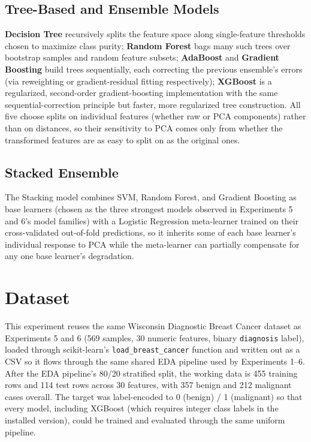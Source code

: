 \documentclass[11pt,a4paper]{article}
\begin{document}
\subsection{Tree-Based and Ensemble Models}
\textbf{Decision Tree} recursively splits the feature space along single-feature thresholds chosen to maximize class purity; \textbf{Random Forest} bags many such trees over bootstrap samples and random feature subsets; \textbf{AdaBoost} and \textbf{Gradient Boosting} build trees sequentially, each correcting the previous ensemble's errors (via reweighting or gradient-residual fitting respectively); \textbf{XGBoost} is a regularized, second-order gradient-boosting implementation with the same sequential-correction principle but faster, more regularized tree construction. All five choose splits on individual features (whether raw or PCA components) rather than on distances, so their sensitivity to PCA comes only from whether the transformed features are as easy to split on as the original ones.

\subsection{Stacked Ensemble}
The Stacking model combines SVM, Random Forest, and Gradient Boosting as base learners (chosen as the three strongest models observed in Experiments 5 and 6's model families) with a Logistic Regression meta-learner trained on their cross-validated out-of-fold predictions, so it inherits some of each base learner's individual response to PCA while the meta-learner can partially compensate for any one base learner's degradation.

\section{Dataset}
This experiment reuses the same Wisconsin Diagnostic Breast Cancer dataset as Experiments 5 and 6 (569 samples, 30 numeric features, binary \texttt{diagnosis} label), loaded through scikit-learn's \texttt{load\_breast\_cancer} function and written out as a CSV so it flows through the same shared EDA pipeline used by Experiments 1--6. After the EDA pipeline's 80/20 stratified split, the working data is 455 training rows and 114 test rows across 30 features, with 357 benign and 212 malignant cases overall. The target was label-encoded to 0 (benign) / 1 (malignant) so that every model, including XGBoost (which requires integer class labels in the installed version), could be trained and evaluated through the same uniform pipeline.
\end{document}
